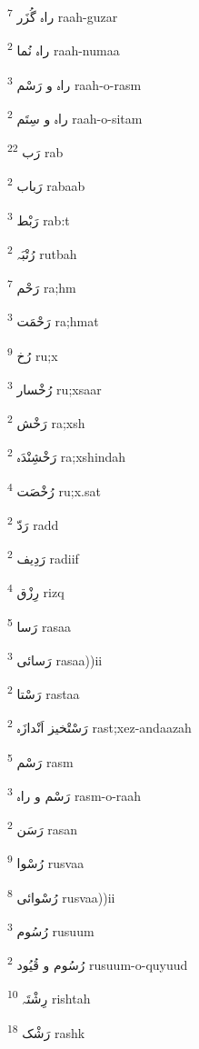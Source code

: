 \documentclass[12pt]{article}
\begin{document}
\begin{RTL}
\begin{multicols}{5}
{\ur راہ گُزَر}   \textsuperscript{7} raah-guzar

{\ur راہ نُما}   \textsuperscript{2} raah-numaa

{\ur راہ و رَسْم}   \textsuperscript{3} raah-o-rasm

{\ur راہ و سِتَم}   \textsuperscript{2} raah-o-sitam

{\ur رَب}   \textsuperscript{22} rab

{\ur رَباب}   \textsuperscript{2} rabaab

{\ur رَبْط}   \textsuperscript{3} rab:t

{\ur رُتْبَہ}   \textsuperscript{2} rutbah

{\ur رَحْم}   \textsuperscript{7} ra;hm

{\ur رَحْمَت}   \textsuperscript{3} ra;hmat

{\ur رُخ}   \textsuperscript{9} ru;x

{\ur رُخْسار}   \textsuperscript{3} ru;xsaar

{\ur رَخْش}   \textsuperscript{2} ra;xsh

{\ur رَخْشِنْدَہ}   \textsuperscript{2} ra;xshindah

{\ur رُخْصَت}   \textsuperscript{4} ru;x.sat

{\ur رَدّ}   \textsuperscript{2} radd

{\ur رَدِیف}   \textsuperscript{2} radiif

{\ur رِزْق}   \textsuperscript{4} rizq

{\ur رَسا}   \textsuperscript{5} rasaa

{\ur رَسائی}   \textsuperscript{3} rasaa))ii

{\ur رَسْتا}   \textsuperscript{2} rastaa

{\ur رَسْتْخیز اَنْدازَہ}   \textsuperscript{2} rast;xez-andaazah

{\ur رَسْم}   \textsuperscript{5} rasm

{\ur رَسْم و راہ}   \textsuperscript{3} rasm-o-raah

{\ur رَسَن}   \textsuperscript{2} rasan

{\ur رُسْوا}   \textsuperscript{9} rusvaa

{\ur رُسْوائی}   \textsuperscript{8} rusvaa))ii

{\ur رُسُوم}   \textsuperscript{3} rusuum

{\ur رُسُوم و قُیُود}   \textsuperscript{2} rusuum-o-quyuud

{\ur رِشْتَہ}   \textsuperscript{10} rishtah

{\ur رَشْک}   \textsuperscript{18} rashk


\end{multicols}
\end{RTL}
\end{document}
